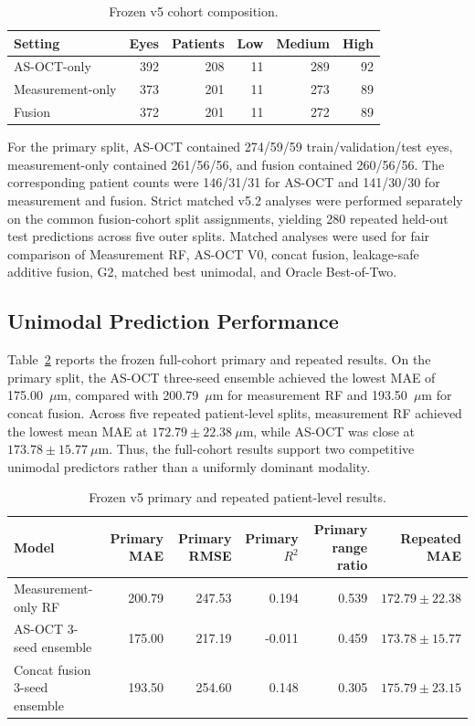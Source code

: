 \documentclass[10pt,twocolumn]{article}
\begin{document}
\begin{table}[t]
\centering
\caption{Frozen v5 cohort composition.}
\label{tab:v5_cohort}
\footnotesize
\setlength{\tabcolsep}{3pt}
\begin{tabular}{lrrrrr}
\toprule
Setting & Eyes & Patients & Low & Medium & High \\
\midrule
AS-OCT-only & 392 & 208 & 11 & 289 & 92 \\
Measurement-only & 373 & 201 & 11 & 273 & 89 \\
Fusion & 372 & 201 & 11 & 272 & 89 \\
\bottomrule
\end{tabular}
\end{table}

For the primary split, AS-OCT contained 274/59/59 train/validation/test eyes, measurement-only contained 261/56/56, and fusion contained 260/56/56. The corresponding patient counts were 146/31/31 for AS-OCT and 141/30/30 for measurement and fusion. Strict matched v5.2 analyses were performed separately on the common fusion-cohort split assignments, yielding 280 repeated held-out test predictions across five outer splits. Matched analyses were used for fair comparison of Measurement RF, AS-OCT V0, concat fusion, leakage-safe additive fusion, G2, matched best unimodal, and Oracle Best-of-Two.

\subsection{Unimodal Prediction Performance}

Table~\ref{tab:v5_main_results} reports the frozen full-cohort primary and repeated results. On the primary split, the AS-OCT three-seed ensemble achieved the lowest MAE of 175.00~$\mu$m, compared with 200.79~$\mu$m for measurement RF and 193.50~$\mu$m for concat fusion. Across five repeated patient-level splits, measurement RF achieved the lowest mean MAE at $172.79 \pm 22.38~\mu$m, while AS-OCT was close at $173.78 \pm 15.77~\mu$m. Thus, the full-cohort results support two competitive unimodal predictors rather than a uniformly dominant modality.

\begin{table}[t]
\centering
\caption{Frozen v5 primary and repeated patient-level results.}
\label{tab:v5_main_results}
\footnotesize
\setlength{\tabcolsep}{5pt}
\begin{tabular}{lrrrrr}
\toprule
Model & Primary MAE & Primary RMSE & Primary $R^2$ & Primary range ratio & Repeated MAE \\
\midrule
Measurement-only RF & 200.79 & 247.53 & 0.194 & 0.539 & $172.79 \pm 22.38$ \\
AS-OCT 3-seed ensemble & 175.00 & 217.19 & -0.011 & 0.459 & $173.78 \pm 15.77$ \\
Concat fusion 3-seed ensemble & 193.50 & 254.60 & 0.148 & 0.305 & $175.79 \pm 23.15$ \\
\bottomrule
\end{tabular}
\end{table}
\end{document}

